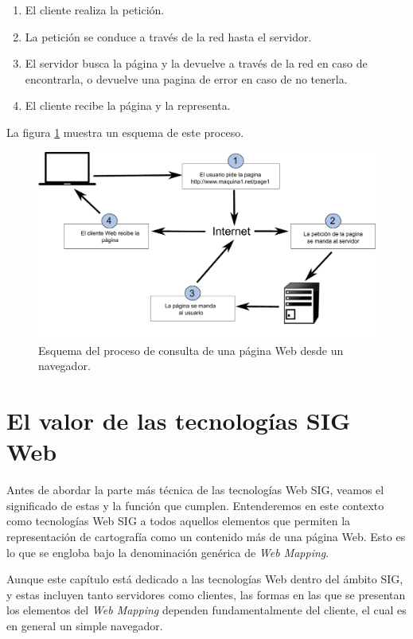 \begin{enumerate}
	\item El cliente realiza la petición.
	\item La petición se conduce a través de la red hasta el servidor.
	\item El servidor busca la página y la devuelve a través de la red en caso de encontrarla, o devuelve una pagina de error en caso de no tenerla.
	\item El cliente recibe la página y la representa.
\end{enumerate}


La figura \ref{Fig:Asi_funciona_internet} muestra un esquema de este proceso.

\begin{figure}[!hbt]   
\centering
\includegraphics[width=.95\mycolumnwidth]{Cliente_servidor/Asi_funciona_internet.pdf}
\caption{\small Esquema del proceso de consulta de una página Web desde un navegador.}
\label{Fig:Asi_funciona_internet} 
\end{figure}

\section{El valor de las tecnologías SIG Web}

Antes de abordar la parte más técnica de las tecnologías Web SIG, veamos el significado de estas y la función que cumplen. Entenderemos en este contexto como tecnologías Web SIG a todos aquellos elementos que permiten la representación de cartografía como un contenido más de una página Web. Esto es lo que se engloba bajo la denominación genérica de \emph{Web Mapping}.

Aunque este capítulo está dedicado a las tecnologías Web dentro del ámbito SIG, y estas incluyen tanto servidores como clientes, las formas en las que se presentan los elementos del \emph{Web Mapping} dependen fundamentalmente del cliente, el cual es en general un simple navegador. 

